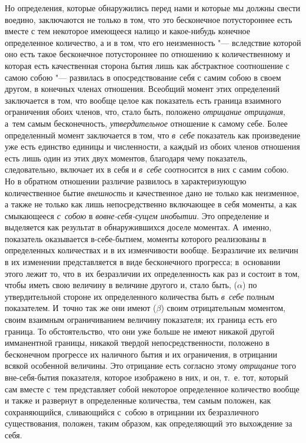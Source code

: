 Но определения, которые обнаружились перед нами и которые мы должны свести
воедино, заключаются не только в том, что это бесконечное потустороннее есть
вместе с тем некоторое имеющееся налицо и какое-нибудь конечное определенное
количество, а и в том, что его неизменность "--- вследствие которой оно есть
такое бесконечное потустороннее по отношению к количественному и которая есть
качественная сторона бытия лишь как абстрактное соотношение с самою собою "---
развилась в опосредствование себя с самим собою в своем другом, в конечных
членах отношения. Всеобщий момент этих определений заключается в том, что
вообще целое как показатель есть граница взаимного ограничения обоих членов,
что, стало быть, положено {\em отрицание отрицания}, а~тем самым бесконечность,
{\em утвердительное} отношение к самому себе. Более определенный момент
заключается в том, что {\em в~себе} показатель как произведение уже есть
единство единицы и численности, а каждый из обоих членов отношения есть лишь
один из этих двух моментов, благодаря чему показатель, следовательно, включает
их в себя и {\em в~себе} соотносится в них с самим собою. Но в обратном
отношении различие развилось в характеризующую количественное бытие
{\em внешность} и качественное дано не только как неизменное, а также не только
как лишь непосредственно включающее в себя моменты, а как смыкающееся
{\em с~собою} в {\em вовне-себя-сущем инобытии}. Это определение и выделяется
как результат в обнаружившихся доселе моментах. А~именно, показатель
оказывается в-себе-бытием, моменты которого реализованы в определенных
количествах и в их изменчивости вообще. Безразличие их величин в их изменении
представляется в виде бесконечного прогресса; в~основании этого лежит то, что
в~их безразличии их определенность как раз и состоит в том, чтобы иметь свою
величину в величине другого и, стало быть, ($\alpha$) по утвердительной стороне
их определенного количества быть {\em в~себе} полным показателем. И~точно так
же они имеют ($\beta$) своим отрицательным моментом, своим взаимным
ограничиванием величину показателя; их граница есть его граница. То
обстоятельство, что они уже больше не имеют никакой другой имманентной границы,
никакой твердой непосредственности, положено в бесконечном
прогрессе их наличного бытия и их ограничения, в отрицании всякой особенной
величины. Это отрицание есть согласно этому {\em отрицание} того вне-себя-бытия
показателя, которое изображено в них, и он, т.~е. тот, который сам вместе с~тем
представляет собой некоторое определенное количество вообще и также и развернут
в определенные количества, тем самым положен, как сохраняющийся, сливающийся
с~собою в отрицании их безразличного существования, положен, таким образом, как
определяющий это выхождение за себя.

